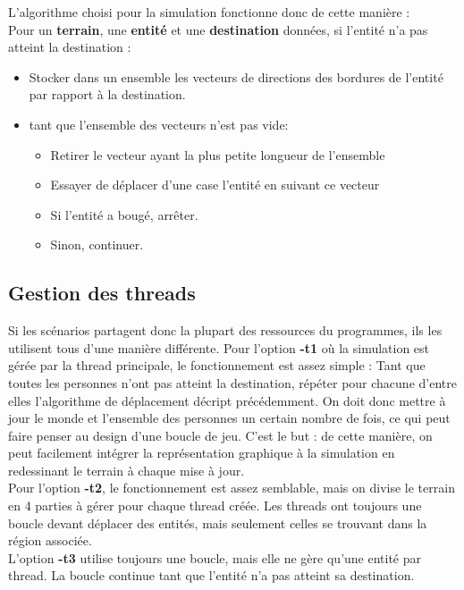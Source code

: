 \documentclass[11pt]{article} %
\begin{document}
\newpage

L'algorithme choisi pour la simulation fonctionne donc de cette manière : \\

Pour un \textbf{terrain}, une \textbf{entité}  et une \textbf{destination} données, si l'entité n'a pas atteint la destination :
\begin{itemize}
	\item Stocker dans un ensemble les vecteurs de directions des bordures de l'entité par rapport à la destination.
	\item tant que l'ensemble des vecteurs n'est pas vide:
	\begin{itemize}
		\item Retirer le vecteur ayant la plus petite longueur de l'ensemble
		\item Essayer de déplacer d'une case l'entité en suivant ce vecteur
		\item Si l'entité a bougé, arrêter.
		\item Sinon, continuer.
	\end{itemize}
	
\end{itemize}

\subsection{Gestion des threads}
Si les scénarios partagent donc la plupart des ressources du programmes, ils les utilisent tous d'une manière différente. 
Pour l'option \textbf{-t1} où la simulation est gérée par la thread principale, le fonctionnement est assez simple : Tant que toutes les personnes n'ont pas atteint la destination, répéter pour chacune d'entre elles l'algorithme de déplacement décript précédemment. On doit donc mettre à jour le monde et l'ensemble des personnes un certain nombre de fois, ce qui peut faire penser au design d'une boucle de jeu. C'est le but : de cette manière, on peut facilement intégrer la représentation graphique à la simulation en redessinant le terrain à chaque mise à jour. \\
Pour l'option \textbf{-t2}, le fonctionnement est assez semblable, mais on divise le terrain en 4 parties à gérer pour chaque thread créée. Les threads ont toujours une boucle devant déplacer des entités, mais seulement celles se trouvant dans la région associée. \\
L'option \textbf{-t3} utilise toujours une boucle, mais elle ne gère qu'une entité par thread. La boucle continue tant que l'entité n'a pas atteint sa destination.
\end{document}
